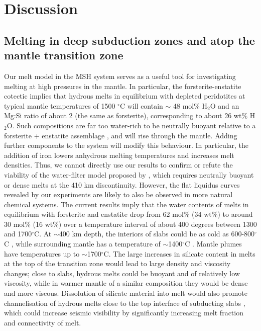\documentclass[review]{elsarticle}
\begin{document}
\section{Discussion}
\subsection{Melting in deep subduction zones and atop the mantle transition zone}
Our melt model in the MSH system serves as a useful tool for investigating melting at high pressures in the mantle. In particular, the forsterite-enstatite cotectic implies that hydrous melts in equilibrium with depleted peridotites at typical mantle temperatures of 1500 $^{\circ}$C will contain $\sim$ 48 mol\% H$_2$O and an Mg:Si ratio of about 2 (the same as forsterite), corresponding to about 26 wt\% H$_2$O. Such compositions are far too water-rich to be neutrally buoyant relative to a forsterite + enstatite assemblage \citep{MSK2008}, and will rise through the mantle. Adding further components to the system will modify this behaviour. In particular, the addition of iron lowers anhydrous melting temperatures and increases melt densities. Thus, we cannot directly use our results to confirm or refute the viability of the water-filter model proposed by \cite{BK2003}, which requires neutrally buoyant or dense melts at the 410 km discontinuity. However, the flat liquidus curves revealed by our experiments are likely to also be observed in more natural chemical systems. The current results imply that the water contents of melts in equilibrium with forsterite and enstatite drop from 62 mol\% (34 wt\%) to around 30 mol\% (16 wt\%) over a temperature interval of about 400 degrees between 1300 and 1700$^{\circ}$C. At $\sim$400 km depth, the interiors of slabs could be as cold as 600-800$^{\circ}$C \citep{Frohlich2006}, while surrounding mantle has a temperature of $\sim$1400$^{\circ}$C \citep{Anderson1982}. Mantle plumes have temperatures up to $\sim$1700$^{\circ}$C. The large increases in silicate content in melts at the top of the transition zone would lead to large density and viscosity changes; close to slabs, hydrous melts could be buoyant and of relatively low viscosity, while in warmer mantle of a similar composition they would be dense and more viscous. Dissolution of silicate material into melt would also promote channelisation of hydrous melts close to the top interface of subducting slabs \citep{SKA2001,WK2012}, which could increase seismic visibility by significantly increasing melt fraction and connectivity of melt.
\end{document}
